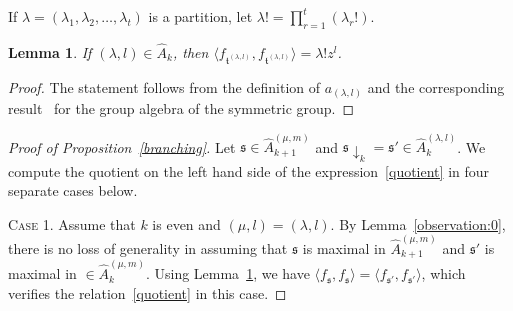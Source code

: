 \documentclass[11pt,a4paper,reqno,svgnames]{amsart}
\theoremstyle{plain}
\newtheorem{lemma}[theorem]{Lemma}
\theoremstyle{definition}
\numberwithin{equation}{section}
\begin{document}
If $\lambda=(\lambda_1,\lambda_2,\ldots,\lambda_t)$ is a partition, let $\lambda!=\prod_{r=1}^t(\lambda_r!)$. 
\begin{lemma}\label{factorial}
If $(\lambda,l)\in\hat{A}_k$, then $\langle f_{\mathfrak{t}^{(\lambda,l)}},f_{\mathfrak{t}^{(\lambda,l)}}\rangle= \lambda!z^l$. 
\end{lemma}
\begin{proof}
The statement follows from the definition of $a_{(\lambda,l)}$ and the corresponding result~\cite[Lemma~3.41]{MR1711316} for the group algebra of the symmetric group. 
\end{proof}
\begin{proof}[Proof of Proposition~\ref{branching}] Let $\mathfrak{s}\in\hat{A}_{k+1}^{(\mu,m)}$ and  $\mathfrak{s}\downarrow_{k}=\mathfrak{s}'\in\hat{A}_k^{(\lambda,l)}$. We compute the quotient on the left hand side of the expression~\eqref{quotient} in four separate cases below.

{\textsc{Case 1.}} Assume that $k$ is even and $(\mu,l)=(\lambda,l)$.  By Lemma~\ref{observation:0}, there is no loss of generality in assuming that $\mathfrak{s}$ is maximal in $\hat{A}_{k+1}^{(\mu,m)}$ and  $\mathfrak{s'}$ is maximal in $\in\hat{A}_{k}^{(\mu,m)}$. Using Lemma~\ref{factorial}, we have
$\langle f_\mathfrak{s},f_\mathfrak{s}\rangle = \langle f_\mathfrak{s'},f_\mathfrak{s'}\rangle$, which verifies the relation~\eqref{quotient} in this case. 


\end{proof}
\end{document}
